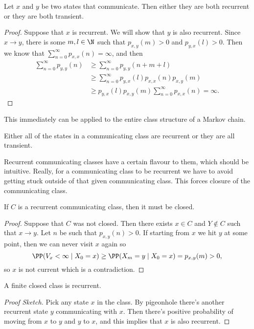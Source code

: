 \documentclass[a4paper]{scrartcl}
\begin{document}
\begin{theorem}
	Let $x$ and $y$ be two states that communicate. Then either they are both recurrent or they are both transient.
\end{theorem}
\begin{proof}
	Suppose that $x$ is recurrent. We will show that $y$ is also recurrent. Since $x \rightarrow y$, there is some $m, l \in \N$ such that $p_{x, y}(m) > 0$ and $p_{y, x}(l) > 0$. Then we know that $\sum_{n = 0}^{\infty} p_{x, x}(n) = \infty$, and then
	\begin{align*}
	\sum_{n = 0}^{\infty} p_{y, y}(n) 
	&\geq \sum_{n = 0}^{\infty} 
	p_{y, y}(n + m + l) \\ 
	&\geq \sum_{n = 0}^{\infty} p_{y, x}(l) p_{x, x}(n) p_{x, y}(m)  \\
	&\geq p_{y, x}(l) p_{x, y}(m) \sum_{n = 0}^{\infty} p_{x, x}(n) = \infty.
	\end{align*}
\end{proof}

This immediately can be applied to the entire class structure of a Markov chain.

\begin{corollary}
	Either all of the states in a communicating class are recurrent or they are all transient.
\end{corollary}

Recurrent communicating classes have a certain flavour to them, which should be intuitive. Really, for a communicating class to be recurrent we have to avoid getting stuck outside of that given communicating class. This forces closure of the communicating class.

\begin{theorem}	
	If $C$ is a recurrent communicating class, then it must be closed.
\end{theorem}
\begin{proof}
	Suppose that $C$ was not closed. Then there exists $x \in C$ and $Y \not \in C$ such that $x \rightarrow y$. Let $n$ be such that $p_{x, y}(n) > 0$. If starting from $x$ we hit $y$ at some point, then we can never visit $x$ again so
	$$
	\PP(V_x < \infty \mid X_0 = x) \geq \PP(X_m = y \mid X_0 = x) = p_{x, y}(m) > 0,
	$$
	so $x$ is not current which is a contradiction.
\end{proof}

\begin{theorem}
	A finite closed class is recurrent.
\end{theorem}
\begin{proof}[Proof Sketch]
	Pick any state $x$ in the class. By pigeonhole there's another recurrent state $y$ communicating with $x$. Then there's positive probability of moving from $x$ to $y$ and $y$ to $x$, and this implies that $x$ is also recurrent.
\end{proof}
\end{document}
